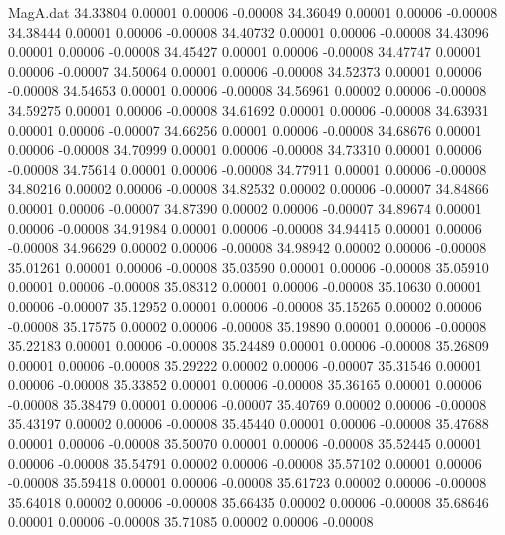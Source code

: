 \begin{filecontents}{MagA.dat}
  34.33804    0.00001    0.00006   -0.00008
  34.36049    0.00001    0.00006   -0.00008
  34.38444    0.00001    0.00006   -0.00008
  34.40732    0.00001    0.00006   -0.00008
  34.43096    0.00001    0.00006   -0.00008
  34.45427    0.00001    0.00006   -0.00008
  34.47747    0.00001    0.00006   -0.00007
  34.50064    0.00001    0.00006   -0.00008
  34.52373    0.00001    0.00006   -0.00008
  34.54653    0.00001    0.00006   -0.00008
  34.56961    0.00002    0.00006   -0.00008
  34.59275    0.00001    0.00006   -0.00008
  34.61692    0.00001    0.00006   -0.00008
  34.63931    0.00001    0.00006   -0.00007
  34.66256    0.00001    0.00006   -0.00008
  34.68676    0.00001    0.00006   -0.00008
  34.70999    0.00001    0.00006   -0.00008
  34.73310    0.00001    0.00006   -0.00008
  34.75614    0.00001    0.00006   -0.00008
  34.77911    0.00001    0.00006   -0.00008
  34.80216    0.00002    0.00006   -0.00008
  34.82532    0.00002    0.00006   -0.00007
  34.84866    0.00001    0.00006   -0.00007
  34.87390    0.00002    0.00006   -0.00007
  34.89674    0.00001    0.00006   -0.00008
  34.91984    0.00001    0.00006   -0.00008
  34.94415    0.00001    0.00006   -0.00008
  34.96629    0.00002    0.00006   -0.00008
  34.98942    0.00002    0.00006   -0.00008
  35.01261    0.00001    0.00006   -0.00008
  35.03590    0.00001    0.00006   -0.00008
  35.05910    0.00001    0.00006   -0.00008
  35.08312    0.00001    0.00006   -0.00008
  35.10630    0.00001    0.00006   -0.00007
  35.12952    0.00001    0.00006   -0.00008
  35.15265    0.00002    0.00006   -0.00008
  35.17575    0.00002    0.00006   -0.00008
  35.19890    0.00001    0.00006   -0.00008
  35.22183    0.00001    0.00006   -0.00008
  35.24489    0.00001    0.00006   -0.00008
  35.26809    0.00001    0.00006   -0.00008
  35.29222    0.00002    0.00006   -0.00007
  35.31546    0.00001    0.00006   -0.00008
  35.33852    0.00001    0.00006   -0.00008
  35.36165    0.00001    0.00006   -0.00008
  35.38479    0.00001    0.00006   -0.00007
  35.40769    0.00002    0.00006   -0.00008
  35.43197    0.00002    0.00006   -0.00008
  35.45440    0.00001    0.00006   -0.00008
  35.47688    0.00001    0.00006   -0.00008
  35.50070    0.00001    0.00006   -0.00008
  35.52445    0.00001    0.00006   -0.00008
  35.54791    0.00002    0.00006   -0.00008
  35.57102    0.00001    0.00006   -0.00008
  35.59418    0.00001    0.00006   -0.00008
  35.61723    0.00002    0.00006   -0.00008
  35.64018    0.00002    0.00006   -0.00008
  35.66435    0.00002    0.00006   -0.00008
  35.68646    0.00001    0.00006   -0.00008
  35.71085    0.00002    0.00006   -0.00008

\end{filecontents}
